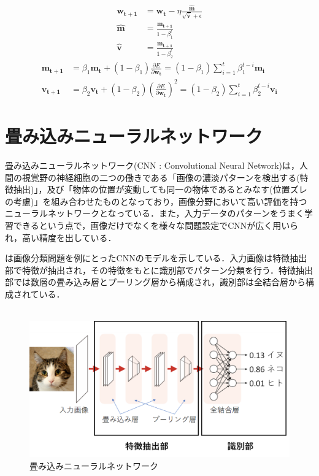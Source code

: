 \begin{align}
	\label{eq:Adam}
	\bm{w_{t+1}} &= \bm{w_{t}} - \eta \frac{\bm{\hat{m}}} {\sqrt{\bm{\hat{v}}} + \epsilon}\\
	\bm{\hat{m}} &= \frac{\bm{m_{t+1}}}{1-\beta_1^t} \nonumber \\
	\bm{\hat{v}} &= \frac{\bm{m_{t+1}}}{1-\beta_2^t} \nonumber
\end{align}
\vspace{-2zh}
\begin{align}
	\bm{m_{t+1}} &= \beta_1\bm{m_t} + (1-\beta_1) \frac{\partial E}{\partial \bm{w_t}} = (1-\beta_1) \sum_{i=1}^{t} \beta_{1}^{t-i} \bm{m_i} \label{eq:beta1} \\
	\bm{v_{t+1}} &= \beta_2\bm{v_t} + (1-\beta_2) (\frac{\partial E}{\partial \bm{w_t}})^2 = (1-\beta_2) \sum_{i=1}^{t} \beta_{2}^{t-i} \bm{v_i} \label{eq:beta2}
\end{align}


\newpage
\section{畳み込みニューラルネットワーク}
畳み込みニューラルネットワーク(CNN : Convolutional Neural Network)は，人間の視覚野の神経細胞の二つの働きである「画像の濃淡パターンを検出する(特徴抽出)」，及び「物体の位置が変動しても同一の物体であるとみなす(位置ズレの考慮)」を組み合わせたものとなっており，画像分野において高い評価を持つニューラルネットワークとなっている\cite{CNN}．また，入力データのパターンをうまく学習できるという点で，画像だけでなくを様々な問題設定でCNNが広く用いられ，高い精度を出している．

は画像分類問題を例にとったCNNのモデルを示している．入力画像は特徴抽出部で特徴が抽出され，その特徴をもとに識別部でパターン分類を行う．特徴抽出部では数層の畳み込み層とプーリング層から構成され，識別部は全結合層から構成されている．
\\
\\

\begin{figure}[htbp]
	\begin{center}
		\includegraphics[scale=1.0]{./images/deeplearning/CNN.png}
		\caption{畳み込みニューラルネットワーク}
		\label{fig:CNN}
	\end{center}
\end{figure}

